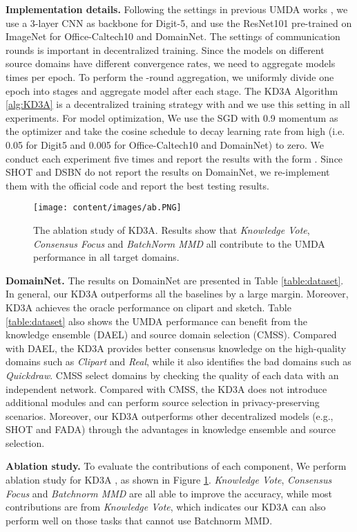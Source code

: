 \documentclass{article}
\begin{document}
\textbf{Implementation details.} Following the settings in previous UMDA works \cite{DBLP:conf/iccv/PengBXHSW19,DBLP:conf/eccv/YangBLS20}, we use a 3-layer CNN as backbone for Digit-5, and use the ResNet101 pre-trained on ImageNet for Office-Caltech10 and DomainNet. The settings of communication rounds  is important in decentralized training. Since the models on different source domains have different convergence rates, we need to aggregate models  times per epoch. To perform the -round aggregation, we uniformly divide one epoch into  stages and aggregate model after each stage. The KD3A Algorithm \ref{alg:KD3A} is a decentralized training strategy with  and we use this setting in all experiments. For model optimization, We use the SGD with 0.9 momentum as the optimizer and take the cosine schedule to decay learning rate from high (i.e. 0.05 for Digit5 and 0.005 for Office-Caltech10 and DomainNet) to zero. We conduct each experiment five times and report the results with the form . Since SHOT and DSBN do not report the results on DomainNet, we re-implement them with the official code and report the best testing results.
\begin{figure}[t]
\centering
\texttt{[image: content/images/ab.PNG]}
\caption{The ablation study of KD3A. Results show that \textit{Knowledge Vote}, \textit{Consensus Focus} and \textit{BatchNorm MMD} all contribute to the UMDA performance in all target domains.}
\label{fig:DFDA-ablation}
\end{figure}

\textbf{DomainNet.} The results on DomainNet are presented in Table \ref{table:dataset}. In general, our KD3A outperforms all the baselines by a large margin. Moreover, KD3A achieves the oracle performance on clipart and sketch. Table \ref{table:dataset} also shows the UMDA performance can benefit from the knowledge ensemble (DAEL) and source domain selection (CMSS). Compared with DAEL, the KD3A provides better consensus knowledge on the high-quality domains such as \textit{Clipart} and \textit{Real}, while it also identifies the bad domains such as \textit{Quickdraw}. CMSS select domains by checking the quality of each data with an independent network. Compared with CMSS, the KD3A does not introduce additional modules and can perform source selection in privacy-preserving scenarios. Moreover, our KD3A outperforms other decentralized models (e.g., SHOT and FADA) through the advantages in knowledge ensemble and source selection. 

\textbf{Ablation study.} To evaluate the contributions of each component, We perform ablation study for KD3A , as shown in Figure \ref{fig:DFDA-ablation}. \textit{Knowledge Vote}, \textit{Consensus Focus} and \textit{Batchnorm MMD} are all able to improve the accuracy, while most contributions are from \textit{Knowledge Vote}, which indicates our KD3A can also perform well on those tasks that cannot use Batchnorm MMD.
\end{document}
